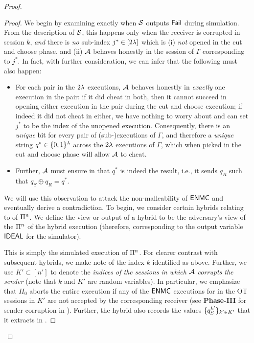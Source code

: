 \begin{proof}
\begin{proof}
        We begin by examining exactly when $\mathcal{S}$ outputs $\mathsf{Fail}$ during simulation. From the description of $\mathcal{S}$, this happens only when the receiver is corrupted in session $k$, {\em and} there is {\em no} sub-index $j^* \in [2\lambda]$ which is (i) {\em not} opened in the cut and choose phase, and (ii) $\mathcal{A}$ behaves honestly in the session of $\Gamma$ corresponding to $j^*$. In fact, with further consideration, we can infer that the following must also happen: 
        \begin{itemize}
            \item For each pair in the $2\lambda$ executions, $\mathcal{A}$ behaves honestly in {\em exactly} one execution in the pair: if it did cheat in both, then it cannot succeed in opening either execution in the pair during the cut and choose execution; if indeed it did not cheat in either, we have nothing to worry about and can set $j^*$ to be the index of the unopened execution. Consequently, there is an {\em unique} bit for every pair of (sub-)executions of $\Gamma$, and therefore a {\em unique} string $q^* \in \{0,1\}^\lambda$ across the $2\lambda$ executions of $\Gamma$, which when picked in the cut and choose phase will allow $\mathcal{A}$ to cheat. 
            \item Further, $\mathcal{A}$ must ensure in  that $q^*$ is indeed the result, i.e., it sends $q_R$ such that $q_S \oplus q_R = q^*$. 
        \end{itemize}
        
        We will use this observation to attack the non-malleability of $\mathsf{ENMC}$ and eventually derive a contradiction. To begin, we consider certain hybrids relating to  of $\mathrm{\Pi}^n$. We define the view or output of a hybrid to be the adversary's view of the $\mathrm{\Pi}^n$ of the hybrid execution (therefore, corresponding to the output variable $\mathsf{IDEAL}$ for the simulator).


         This is simply the simulated execution of $\mathrm{\Pi}^n$. For clearer contrast with subsequent hybrids, we make note of the index $k$ identified as above. Further, we use   $K' \subset [n']$ to denote the {\em indices of the sessions in which $\mathcal{A}$ corrupts the sender} (note that $k$ and $K'$ are random variables). In particular, we emphasize that $H_0$ aborts the entire execution if any of the $\mathsf{ENMC}$ executions for   in the OT sessions in $K'$ are not accepted by the corresponding receiver (see {\bf Phase-III} for sender corruption in ). Further, the hybrid also records the values $\{q_S^{k'}\}_{k' \in K'}$ that it extracts in . 


\end{proof}
\end{proof}
